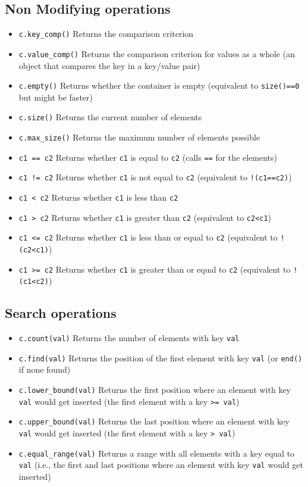 \documentclass{report}
\begin{document}
\bigbreak \noindent
\subsection{Non Modifying operations}
\begin{itemize}
    \item \texttt{c.key\_comp()} Returns the comparison criterion
    \item \texttt{c.value\_comp()} Returns the comparison criterion for values as a whole (an object that compares the key in a key/value pair)
    \item \texttt{c.empty()} Returns whether the container is empty (equivalent to \texttt{size()==0} but might be faster)
    \item \texttt{c.size()} Returns the current number of elements
    \item \texttt{c.max\_size()} Returns the maximum number of elements possible
    \item \texttt{c1 == c2} Returns whether \texttt{c1} is equal to \texttt{c2} (calls \texttt{==} for the elements)
    \item \texttt{c1 != c2} Returns whether \texttt{c1} is not equal to \texttt{c2} (equivalent to \texttt{!(c1==c2)})
    \item \texttt{c1 < c2} Returns whether \texttt{c1} is less than \texttt{c2}
    \item \texttt{c1 > c2} Returns whether \texttt{c1} is greater than \texttt{c2} (equivalent to \texttt{c2<c1})
    \item \texttt{c1 <= c2} Returns whether \texttt{c1} is less than or equal to \texttt{c2} (equivalent to \texttt{!(c2<c1)})
    \item \texttt{c1 >= c2} Returns whether \texttt{c1} is greater than or equal to \texttt{c2} (equivalent to \texttt{!(c1<c2)})
\end{itemize}

\bigbreak \noindent 
\subsection{Search operations}
\begin{itemize}
    \item \texttt{c.count(val)} Returns the number of elements with key \texttt{val}
    \item \texttt{c.find(val)} Returns the position of the first element with key \texttt{val} (or \texttt{end()} if none found)
    \item \texttt{c.lower\_bound(val)} Returns the first position where an element with key \texttt{val} would get inserted (the first element with a key \texttt{>= val})
    \item \texttt{c.upper\_bound(val)} Returns the last position where an element with key \texttt{val} would get inserted (the first element with a key \texttt{> val})
    \item \texttt{c.equal\_range(val)} Returns a range with all elements with a key equal to \texttt{val} (i.e., the first and last positions where an element with key \texttt{val} would get inserted)
\end{itemize}
\bigbreak \noindent 
\end{document}
